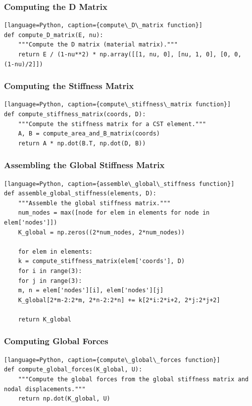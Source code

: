 \documentclass[12pt]{report}
\begin{document}
	\subsubsection{Computing the D Matrix}
	\begin{lstlisting}[style=mypython][language=Python, caption={compute\_D\_matrix function}]
def compute_D_matrix(E, nu):
	"""Compute the D matrix (material matrix)."""
	return E / (1-nu**2) * np.array([[1, nu, 0], [nu, 1, 0], [0, 0, (1-nu)/2]])
	\end{lstlisting}
	
	\subsubsection{Computing the Stiffness Matrix}
	\begin{lstlisting}[style=mypython][language=Python, caption={compute\_stiffness\_matrix function}]
def compute_stiffness_matrix(coords, D):
	"""Compute the stiffness matrix for a CST element."""
	A, B = compute_area_and_B_matrix(coords)
	return A * np.dot(B.T, np.dot(D, B))
	\end{lstlisting}
	
	\subsubsection{Assembling the Global Stiffness Matrix}
	\begin{lstlisting}[style=mypython][language=Python, caption={assemble\_global\_stiffness function}]
def assemble_global_stiffness(elements, D):
	"""Assemble the global stiffness matrix."""
	num_nodes = max([node for elem in elements for node in elem['nodes']])
	K_global = np.zeros((2*num_nodes, 2*num_nodes))
	
	for elem in elements:
	k = compute_stiffness_matrix(elem['coords'], D)
	for i in range(3):
	for j in range(3):
	m, n = elem['nodes'][i], elem['nodes'][j]
	K_global[2*m-2:2*m, 2*n-2:2*n] += k[2*i:2*i+2, 2*j:2*j+2]
	
	return K_global
	\end{lstlisting}
	
	\subsubsection{Computing Global Forces}
	\begin{lstlisting}[style=mypython][language=Python, caption={compute\_global\_forces function}]
def compute_global_forces(K_global, U):
	"""Compute the global forces from the global stiffness matrix and nodal displacements."""
	return np.dot(K_global, U)
	\end{lstlisting}
	
\end{document}
